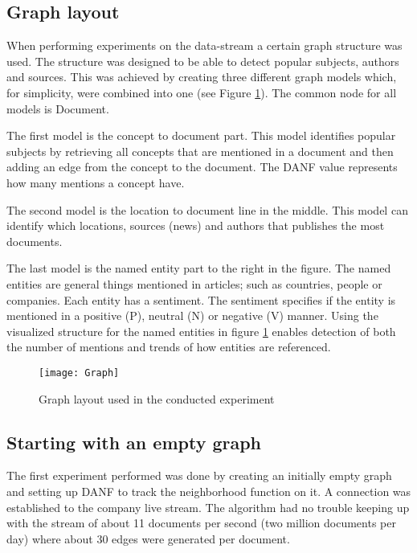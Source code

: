 \subsection{Graph layout}

When performing experiments on the data-stream a certain graph structure was used. The structure was designed to be able to detect popular subjects, authors and sources. This was achieved by creating three different graph models which, for simplicity, were combined into one (see Figure \ref{fig:experiment-graph}). The common node for all models is Document. 

The first model is the concept to document part. This model identifies popular subjects by retrieving all concepts that are mentioned in a document and then adding an edge from the concept to the document. The DANF value represents how many mentions a concept have. 

The second model is the location to document line in the middle. This model can identify which locations, sources (news) and authors that publishes the most documents.

The last model is the named entity part to the right in the figure. The named entities are general things mentioned in articles; such as countries, people or companies. Each entity has a sentiment. The sentiment specifies if the entity is mentioned in a positive (P), neutral (N) or negative (V) manner. Using the visualized structure for the named entities in figure \ref{fig:experiment-graph} enables detection of both the number of mentions and trends of how entities are referenced.

\begin{figure}[h]
\centering
\texttt{[image: Graph]}    
\captionsetup{justification=centering}
\caption {Graph layout used in the conducted experiment}
\label{fig:experiment-graph}
\end{figure}


\subsection{Starting with an empty graph}

The first experiment performed was done by creating an initially empty graph and setting up DANF to track the neighborhood function on it. A connection was established to the company live stream. The algorithm had no trouble keeping up with the stream of about 11 documents per second (two million documents per day) where about 30 edges were generated per document. 

